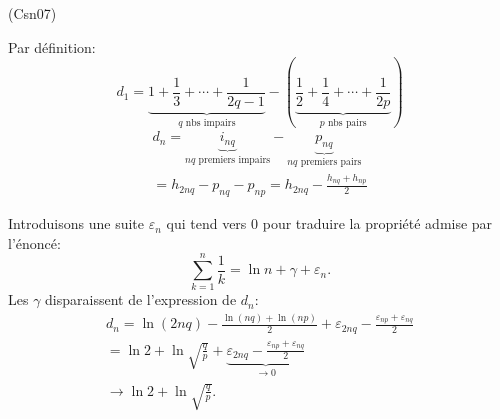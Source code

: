 \begin{tiny}(Csn07)\end{tiny} Par définition:
\[
 d_1 = \underset{q \text{ nbs impairs}}{\underbrace{1 + \frac{1}{3} + \cdots + \frac{1}{2q-1}}} 
 - \left(\underset{p\text{ nbs pairs}}{\underbrace{ \frac{1}{2} + \frac{1}{4} + \cdots + \frac{1}{2p}}}\right)  
\]
\begin{multline*}
 d_n = \underset{nq\text{ premiers impairs}}{\underbrace{i_{nq}}} 
 - \underset{nq\text{ premiers pairs}}{\underbrace{p_{nq}}}\\
 = h_{2nq} - p_{nq} - p_{np}
 = h_{2nq} - \frac{h_{nq} + h_{np}}{2}
\end{multline*}

Introduisons une suite $\varepsilon_n$ qui tend vers $0$ pour traduire la propriété admise par l'énoncé:
\[
 \sum_{k=1}^{n}\frac{1}{k} = \ln n + \gamma + \varepsilon_n.
\]
Les $\gamma$ disparaissent de l'expression de $d_n$:
\begin{multline*}
 d_n = \ln(2nq) - \frac{\ln(nq) + \ln(np)}{2} + \varepsilon_{2nq} - \frac{\varepsilon_{np} + \varepsilon_{nq}}{2}\\
 = \ln 2 + \ln \sqrt{\frac{q}{p}} + \underset{\rightarrow 0}{\underbrace{\varepsilon_{2nq} - \frac{\varepsilon_{np} + \varepsilon_{nq}}{2}}}\\
 \rightarrow \ln 2 + \ln \sqrt{\frac{q}{p}}.
\end{multline*}
